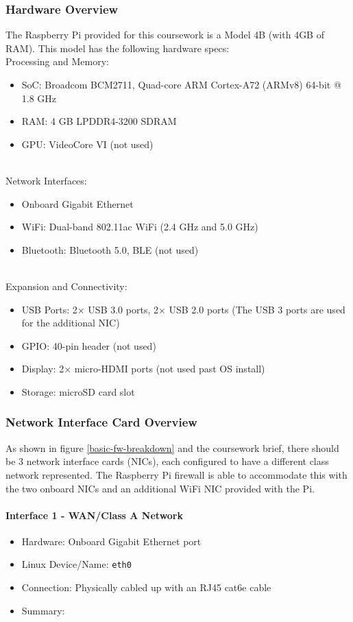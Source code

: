 \subsubsection{Hardware Overview}
The Raspberry Pi provided for this coursework is a Model 4B (with 4GB of RAM). This model has the following hardware specs:
\\Processing and Memory:
\begin{itemize}
    \item SoC: Broadcom BCM2711, Quad-core ARM Cortex-A72 (ARMv8) 64-bit @ 1.8 GHz
    \item RAM: 4 GB LPDDR4-3200 SDRAM
    \item GPU: VideoCore VI (not used)
\end{itemize}
\\Network Interfaces:
    \begin{itemize}
    \item Onboard Gigabit Ethernet
    \item WiFi: Dual-band 802.11ac WiFi (2.4 GHz and 5.0 GHz)
    \item Bluetooth: Bluetooth 5.0, BLE (not used)
\end{itemize}
\\Expansion and Connectivity:
\begin{itemize}
    \item USB Ports: 2× USB 3.0 ports, 2× USB 2.0 ports (The USB 3 ports are used for the additional NIC)
    \item GPIO: 40-pin header (not used)
    \item Display: 2× micro-HDMI ports (not used past OS install)
    \item Storage: microSD card slot
\end{itemize}

\subsubsection{Network Interface Card Overview}
As shown in figure \ref{basic-fw-breakdown} and the coursework brief, there should be 3 network interface cards (NICs), each configured to have a different class network represented. The Raspberry Pi firewall is able to accommodate this with the two onboard NICs and an additional WiFi NIC provided with the Pi.
\paragraph{Interface 1 - WAN/Class A Network}
\begin{itemize}
    \item Hardware: Onboard Gigabit Ethernet port
    \item Linux Device/Name: \verb|eth0|
    \item Connection: Physically cabled up with an RJ45 cat6e cable
    \item Summary: 
\end{itemize}

